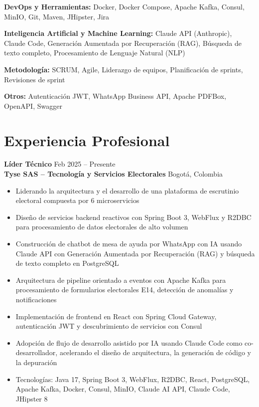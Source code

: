 \documentclass[11pt,a4paper]{article}
\begin{document}
\textbf{DevOps y Herramientas:} Docker, Docker Compose, Apache Kafka, Consul, MinIO, Git, Maven, JHipster, Jira

\textbf{Inteligencia Artificial y Machine Learning:} Claude API (Anthropic), Claude Code, Generaci\'{o}n Aumentada por Recuperaci\'{o}n (RAG), B\'{u}squeda de texto completo, Procesamiento de Lenguaje Natural (NLP)

\textbf{Metodolog\'{i}a:} SCRUM, Agile, Liderazgo de equipos, Planificaci\'{o}n de sprints, Revisiones de sprint

\textbf{Otros:} Autenticaci\'{o}n JWT, WhatsApp Business API, Apache PDFBox, OpenAPI, Swagger

\section{Experiencia Profesional}

\textbf{L\'{i}der T\'{e}cnico} \hfill Feb 2025 -- Presente \\
\textbf{Tyse SAS -- Tecnolog\'{i}a y Servicios Electorales} \hfill Bogot\'{a}, Colombia
\begin{itemize}
    \item Liderando la arquitectura y el desarrollo de una plataforma de escrutinio electoral compuesta por 6 microservicios
    \item Dise\~{n}o de servicios backend reactivos con Spring Boot 3, WebFlux y R2DBC para procesamiento de datos electorales de alto volumen
    \item Construcci\'{o}n de chatbot de mesa de ayuda por WhatsApp con IA usando Claude API con Generaci\'{o}n Aumentada por Recuperaci\'{o}n (RAG) y b\'{u}squeda de texto completo en PostgreSQL
    \item Arquitectura de pipeline orientado a eventos con Apache Kafka para procesamiento de formularios electorales E14, detecci\'{o}n de anomal\'{i}as y notificaciones
    \item Implementaci\'{o}n de frontend en React con Spring Cloud Gateway, autenticaci\'{o}n JWT y descubrimiento de servicios con Consul
    \item Adopci\'{o}n de flujo de desarrollo asistido por IA usando Claude Code como co-desarrollador, acelerando el dise\~{n}o de arquitectura, la generaci\'{o}n de c\'{o}digo y la depuraci\'{o}n
    \item Tecnolog\'{i}as: Java 17, Spring Boot 3, WebFlux, R2DBC, React, PostgreSQL, Apache Kafka, Docker, Consul, MinIO, Claude AI API, Claude Code, JHipster 8
\end{itemize}
\end{document}
